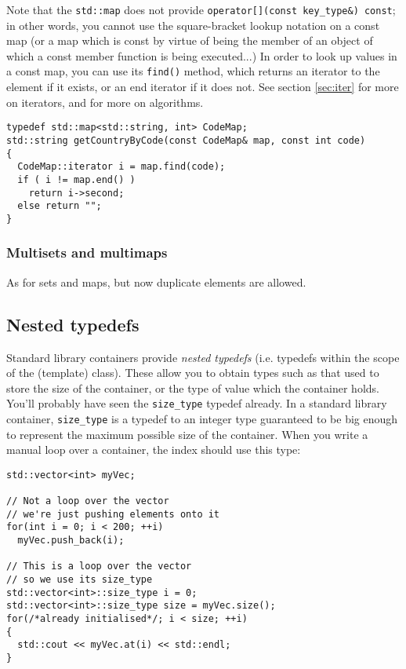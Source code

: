 \documentclass[a4paper]{scrartcl}
\begin{document}
Note that the \verb|std::map| does not provide \verb|operator[](const key_type&) const|; in other words, you cannot use the square-bracket lookup notation on a const map (or a map which is const by virtue of being the member of an object of which a const member function is being executed...) In order to look up values in a const map, you can use its \verb|find()| method, which returns an iterator to the element if it exists, or an end iterator if it does not. See section \ref{sec:iter} for more on iterators, and\cite{StandardLibrary} for more on algorithms.

\begin{verbatim}
typedef std::map<std::string, int> CodeMap;
std::string getCountryByCode(const CodeMap& map, const int code)
{
  CodeMap::iterator i = map.find(code);
  if ( i != map.end() )
    return i->second;
  else return "";
}
\end{verbatim}

\subsubsection{Multisets and multimaps}\label{sec:containers_associative_multi}
As for sets and maps, but now duplicate elements are allowed.

\subsection{Nested typedefs}
Standard library containers provide \emph{nested typedefs} (i.e. typedefs within the scope of the (template) class). These allow you to obtain types such as that used to store the size of the container, or the type of value which the container holds. You'll probably have seen the \verb|size_type| typedef already. In a standard library container, \verb|size_type| is a typedef to an integer type guaranteed to be big enough to represent the maximum possible size of the container. When you write a manual loop over a container, the index should use this type:

\begin{verbatim}
std::vector<int> myVec;

// Not a loop over the vector
// we're just pushing elements onto it
for(int i = 0; i < 200; ++i)
  myVec.push_back(i);

// This is a loop over the vector
// so we use its size_type
std::vector<int>::size_type i = 0;
std::vector<int>::size_type size = myVec.size();
for(/*already initialised*/; i < size; ++i)
{
  std::cout << myVec.at(i) << std::endl;
}
\end{verbatim}
\end{document}
